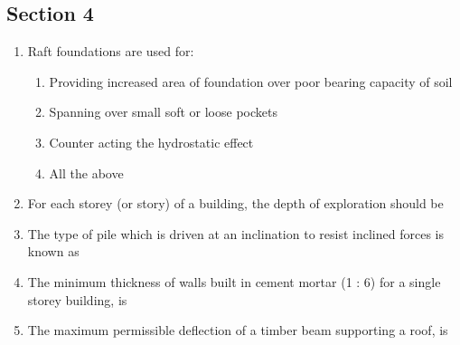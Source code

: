 \documentclass[11pt,a4paper]{article}
\begin{document}
\subsection*{Section 4}
\begin{enumerate}
\item{Raft foundations are used for:}
\begin{enumerate}[label=\Alph*.]
\item{Providing increased area of foundation over poor bearing capacity of soil}
\item{Spanning over small soft or loose pockets}
\item{Counter acting the hydrostatic effect}
\item{All the above}
\end{enumerate}
\item{For each storey (or story) of a building, the depth of exploration should be}
\\
\item{The type of pile which is driven at an inclination to resist inclined forces is known as}
\\
\item{The minimum thickness of walls built in cement mortar (1 : 6) for a single storey building, is}
\\\begin{enumerate*}[itemjoin=\qquad, label=\Alph*.]
\item{10 cm}
\item{15 cm}
\item{20 cm}
\item{25 cm}
\end{enumerate*}
\item{The maximum permissible deflection of a timber beam supporting a roof, is}
\\\begin{enumerate*}[itemjoin=\qquad, label=\Alph*.]

\end{enumerate*}
\end{enumerate}
\end{document}
